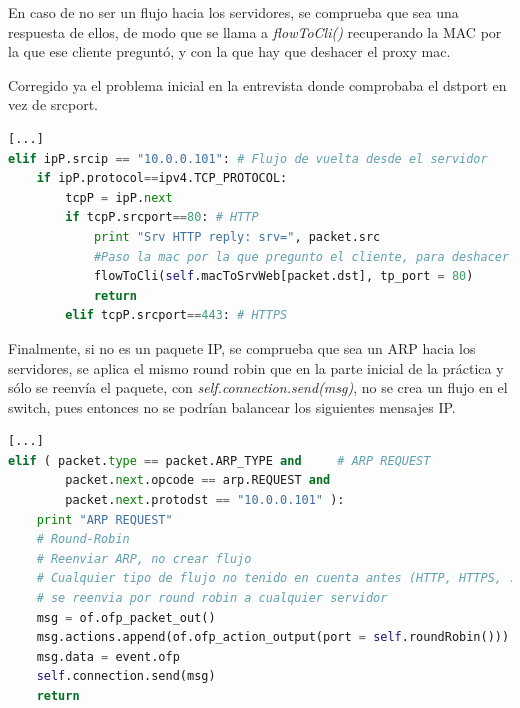 \documentclass{article}
\begin{document}
En caso de no ser un flujo hacia los servidores, se comprueba que sea una respuesta de ellos, de modo que se llama a \textit{flowToCli()} recuperando la MAC por la que ese cliente preguntó, y con la que hay que deshacer el proxy mac.

Corregido ya el problema inicial en la entrevista donde comprobaba el dstport en vez de srcport.

\begin{lstlisting}[language=Python]
[...]
elif ipP.srcip == "10.0.0.101": # Flujo de vuelta desde el servidor
	if ipP.protocol==ipv4.TCP_PROTOCOL:
		tcpP = ipP.next
		if tcpP.srcport==80: # HTTP
			print "Srv HTTP reply: srv=", packet.src
			#Paso la mac por la que pregunto el cliente, para deshacer proxy mac
			flowToCli(self.macToSrvWeb[packet.dst], tp_port = 80)
			return
		elif tcpP.srcport==443: # HTTPS
\end{lstlisting}

Finalmente, si no es un paquete IP, se comprueba que sea un ARP hacia los servidores, se aplica el mismo round robin que en la parte inicial de la práctica y sólo se reenvía el paquete, con \textit{self.connection.send(msg)}, no se crea un flujo en el switch, pues entonces no se podrían balancear los siguientes mensajes IP.

\begin{lstlisting}[language=Python]
[...]
elif ( packet.type == packet.ARP_TYPE and     # ARP REQUEST
		packet.next.opcode == arp.REQUEST and
		packet.next.protodst == "10.0.0.101" ):
	print "ARP REQUEST"
	# Round-Robin
	# Reenviar ARP, no crear flujo
	# Cualquier tipo de flujo no tenido en cuenta antes (HTTP, HTTPS, ...)
	# se reenvia por round robin a cualquier servidor
	msg = of.ofp_packet_out()
	msg.actions.append(of.ofp_action_output(port = self.roundRobin()))
	msg.data = event.ofp
	self.connection.send(msg)
	return
\end{lstlisting}








\appendix
\end{document}
